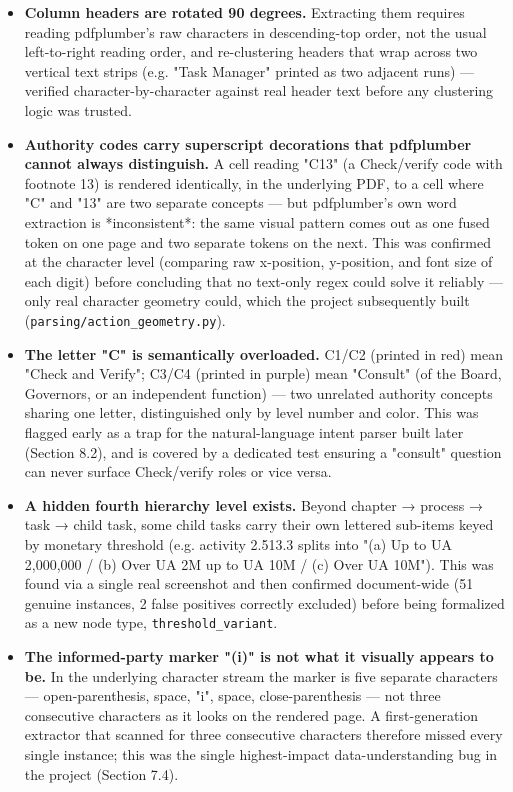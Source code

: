 \begin{itemize}
\item \textbf{Column headers are rotated 90 degrees.} Extracting them requires reading pdfplumber's raw characters in descending-top order, not the usual left-to-right reading order, and re-clustering headers that wrap across two vertical text strips (e.g. "Task Manager" printed as two adjacent runs) — verified character-by-character against real header text before any clustering logic was trusted.
\item \textbf{Authority codes carry superscript decorations that pdfplumber cannot always distinguish.} A cell reading "C13" (a Check/verify code with footnote 13) is rendered identically, in the underlying PDF, to a cell where "C" and "13" are two separate concepts — but pdfplumber's own word extraction is *inconsistent*: the same visual pattern comes out as one fused token on one page and two separate tokens on the next. This was confirmed at the character level (comparing raw x-position, y-position, and font size of each digit) before concluding that no text-only regex could solve it reliably — only real character geometry could, which the project subsequently built (\texttt{parsing/\allowbreak{}action\_\allowbreak{}geometry.py}).
\item \textbf{The letter "C" is semantically overloaded.} C1/C2 (printed in red) mean "Check and Verify"; C3/C4 (printed in purple) mean "Consult" (of the Board, Governors, or an independent function) — two unrelated authority concepts sharing one letter, distinguished only by level number and color. This was flagged early as a trap for the natural-language intent parser built later (Section 8.2), and is covered by a dedicated test ensuring a "consult" question can never surface Check/verify roles or vice versa.
\item \textbf{A hidden fourth hierarchy level exists.} Beyond chapter → process → task → child task, some child tasks carry their own lettered sub-items keyed by monetary threshold (e.g. activity 2.513.3 splits into "(a) Up to UA 2,000,000 / (b) Over UA 2M up to UA 10M / (c) Over UA 10M"). This was found via a single real screenshot and then confirmed document-wide (51 genuine instances, 2 false positives correctly excluded) before being formalized as a new node type, \texttt{threshold\_\allowbreak{}variant}.
\item \textbf{The informed-party marker "(i)" is not what it visually appears to be.} In the underlying character stream the marker is five separate characters — open-parenthesis, space, "i", space, close-parenthesis — not three consecutive characters as it looks on the rendered page. A first-generation extractor that scanned for three consecutive characters therefore missed every single instance; this was the single highest-impact data-understanding bug in the project (Section 7.4).

\end{itemize}
